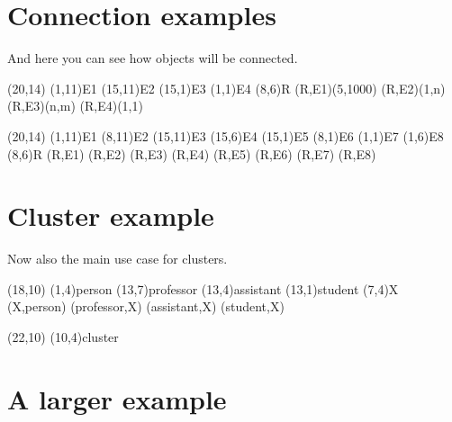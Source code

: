 \documentclass[a4paper,11pt]{article}
\begin{document}
\section{Connection examples}

And here you can see how objects will be connected.

\begin{schema}(20,14)
  \entity(1,11){E1}
  \entity(15,11){E2}
  \entity(15,1){E3}
  \entity(1,1){E4}
  \relation(8,6){R}
  \connection(R,E1){(5,1000)}
  \connection(R,E2){(1,n)}
  \connection(R,E3){(n,m)}
  \connection(R,E4){(1,1)}
\end{schema}

\begin{schema}(20,14)
  \entity(1,11){E1}
  \entity(8,11){E2}
  \entity(15,11){E3}
  \entity(15,6){E4}
  \entity(15,1){E5}
  \entity(8,1){E6}
  \entity(1,1){E7}
  \entity(1,6){E8}
  \relation(8,6){R}
  \connection(R,E1){}
  \connection(R,E2){}
  \connection(R,E3){}
  \connection(R,E4){}
  \connection(R,E5){}
  \connection(R,E6){}
  \connection(R,E7){}
  \connection(R,E8){}
\end{schema}

\section{Cluster example}

Now also the main use case for clusters.

\begin{schema}(18,10)
  \entity(1,4){person}
  \relation(13,7){professor}
  \relation(13,4){assistant}
  \relation(13,1){student}
  \cluster(7,4){X}
  \connection(X,person){}
  \connection(professor,X){}
  \connection(assistant,X){}
  \connection(student,X){}
\end{schema}

\begin{schema}(22,10)
  \cluster(10,4){cluster}
\end{schema}

\section{A larger example}
\end{document}
